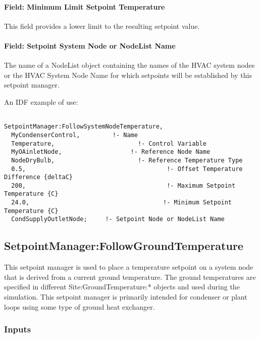 \paragraph{Field: Minimum Limit Setpoint Temperature}\label{field-minimum-limit-setpoint-temperature}

This field provides a lower limit to the resulting setpoint value.

\paragraph{Field: Setpoint System Node or NodeList Name}\label{field-setpoint-system-node-or-nodelist-name}

The name of a NodeList object containing the names of the HVAC system nodes or the HVAC System Node Name for which setpoints will be established by this setpoint manager.

An IDF example of use:

\begin{lstlisting}

SetpointManager:FollowSystemNodeTemperature,
  MyCondenserControl,         !- Name
  Temperature,                       !- Control Variable
  MyOAinletNode,                   !- Reference Node Name
  NodeDryBulb,                       !- Reference Temperature Type
  0.5,                                       !- Offset Temperature Difference {deltaC}
  200,                                       !- Maximum Setpoint Temperature {C}
  24.0,                                     !- Minimum Setpoint Temperature {C}
  CondSupplyOutletNode;     !- Setpoint Node or NodeList Name
\end{lstlisting}

\subsection{SetpointManager:FollowGroundTemperature}\label{setpointmanagerfollowgroundtemperature}

This setpoint manager is used to place a temperature setpoint on a system node that is derived from a current ground temperature. The ground temperatures are specified in different Site:GroundTemperature:* objects and used during the simulation. This setpoint manager is primarily intended for condenser or plant loops using some type of ground heat exchanger.

\subsubsection{Inputs}\label{inputs-22-004}


